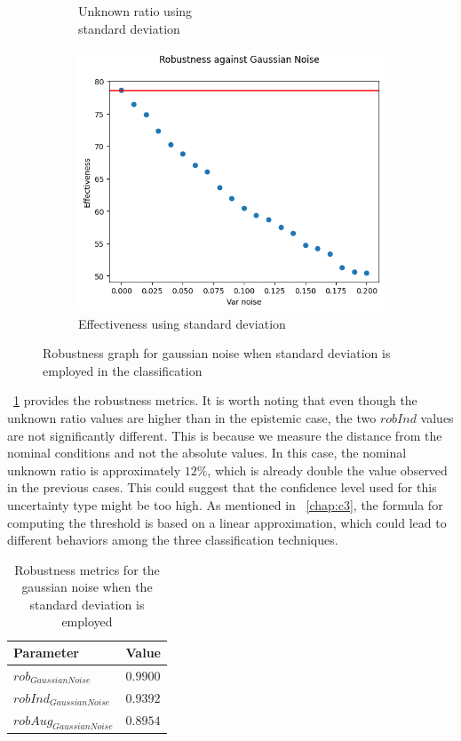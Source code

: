 \begin{figure}[h]
\begin{subfigure}{.33\textwidth}
		\caption{Unknown ratio using \\ standard deviation}
		\label{fig:gn_vu_unkn}
	\end{subfigure}%
	\begin{subfigure}{.33\textwidth}
		\centering
		\includegraphics[width=0.9\linewidth]{ImageFiles/EvalBNN/GN/VU/eff}
		\caption{Effectiveness using standard deviation}
		\label{fig:gn_vu_eff}
	\end{subfigure}
	\caption{Robustness graph for gaussian noise when standard deviation is employed in the classification}
	\label{fig:gn_vu}
\end{figure}

\Tab~\ref{table:rob_gn_vu} provides the robustness metrics. It is worth noting that even though the unknown ratio values are higher than in the epistemic case, the two $robInd$ values are not significantly different. This is because we measure the distance from the nominal conditions and not the absolute values. In this case, the nominal unknown ratio is approximately $12\%$, which is already double the value observed in the previous cases. This could suggest that the confidence level used for this uncertainty type might be too high. As mentioned in \Chap~\ref{chap:c3}, the formula for computing the threshold is based on a linear approximation, which could lead to different behaviors among the three classification techniques.

\begin{table}[h]
	\centering
	\begin{tabular}{|| l | l ||} 
		\hline
		\textbf{Parameter} & \textbf{Value} \\
		\hline
		\hline
		$rob_{GaussianNoise}$ & $0.9900$ \\
		$robInd_{GaussianNoise}$ & $0.9392$ \\
		$robAug_{GaussianNoise}$ & $0.8954$ \\	
		\hline
	\end{tabular}	
	\caption{Robustness metrics for the gaussian noise when the standard deviation is employed}
	\label{table:rob_gn_vu}
\end{table}

